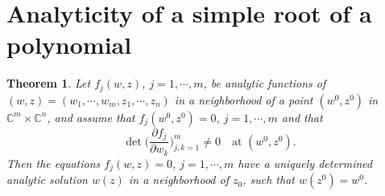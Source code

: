 \documentclass[a4paper,11pt]{article}
\newtheorem{theorem}{Theorem}
\theoremstyle{remark}
\begin{document}
\pagebreak

\appendix
\renewcommand\thetheorem{\Alph{theorem}}
\setcounter{theorem}{\thetmp}
\section{Analyticity of a simple root of a polynomial}



\begin{theorem}{\cite[p. 24]{Hormander66}} \label{thm:anal} Let $f_j(w,z)$, $j=1,\cdots,m$, be analytic functions of $(w,z)=(w_1,\cdots,w_m,z_1,\cdots,z_n)$ in a neighborhood of a point $(w^0,z^0)$ in $\mathbb{C}^m\times \mathbb{C}^n$, and assume that $f_j(w^0,z^0)=0$, $j=1,\cdots,m$ and that
$$ \det\Big( \frac{\partial f_j}{\partial w_k} \Big)_{j,k=1}^m \ne 0 \quad \text{at $(w^0,z^0)$}.$$
Then the equations $f_j(w,z)=0$, $j=1,\cdots,m$ have a uniquely determined analytic solution $w(z)$ in a neighborhood of $z_0$, such that $w(z^0)=w^0$.
\end{theorem}
\end{document}

